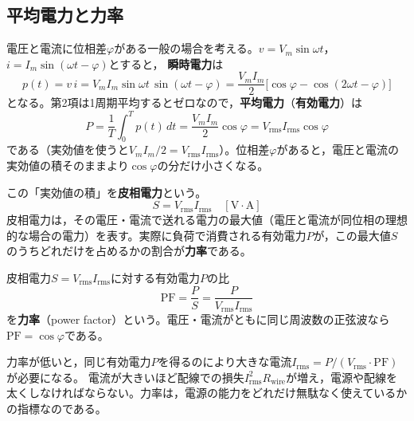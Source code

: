 \subsection{平均電力と力率}

電圧と電流に位相差$\varphi$がある一般の場合を考える。$v = V_m\sin\omega t$，$i = I_m\sin(\omega t - \varphi)$とすると，
\textbf{瞬時電力}は
\begin{equation}
p(t) = v\,i = V_m I_m \sin\omega t\,\sin(\omega t - \varphi)
= \frac{V_m I_m}{2}\bigl[\cos\varphi - \cos(2\omega t - \varphi)\bigr]
\label{eq8.15}
\end{equation}
となる。第2項は1周期平均するとゼロなので，\textbf{平均電力}（\textbf{有効電力}）は
\begin{equation}
P = \frac{1}{T}\int_0^T p(t)\, dt = \frac{V_m I_m}{2}\cos\varphi
= V_{\mathrm{rms}} I_{\mathrm{rms}} \cos\varphi
\label{eq8.16}
\end{equation}
である（実効値を使うと$V_m I_m/2 = V_{\mathrm{rms}} I_{\mathrm{rms}}$）。位相差$\varphi$があると，電圧と電流の実効値の積そのままより$\cos\varphi$の分だけ小さくなる。

この「実効値の積」を\textbf{皮相電力}という。
\begin{equation}
S = V_{\mathrm{rms}} I_{\mathrm{rms}} \quad [\mathrm{V\cdot A}]
\label{eq8.17}
\end{equation}
皮相電力は，その電圧・電流で送れる電力の最大値（電圧と電流が同位相の理想的な場合の電力）を表す。実際に負荷で消費される有効電力$P$が，この最大値$S$のうちどれだけを占めるかの割合が\textbf{力率}である。

\begin{定義}[力率]
\label{def8.2}
皮相電力$S = V_{\mathrm{rms}} I_{\mathrm{rms}}$に対する有効電力$P$の比
\begin{equation}
\mathrm{PF} = \frac{P}{S} = \frac{P}{V_{\mathrm{rms}} I_{\mathrm{rms}}}
\label{eq8.18}
\end{equation}
を\textbf{力率}（power factor）という。電圧・電流がともに同じ周波数の正弦波なら$\mathrm{PF} = \cos\varphi$である。
\end{定義}

力率が低いと，同じ有効電力$P$を得るのにより大きな電流$I_{\mathrm{rms}} = P/(V_{\mathrm{rms}}\cdot\mathrm{PF})$が必要になる。
電流が大きいほど配線での損失$I_{\mathrm{rms}}^2 R_{\mathrm{wire}}$が増え，電源や配線を太くしなければならない。力率は，電源の能力をどれだけ無駄なく使えているかの指標なのである。

